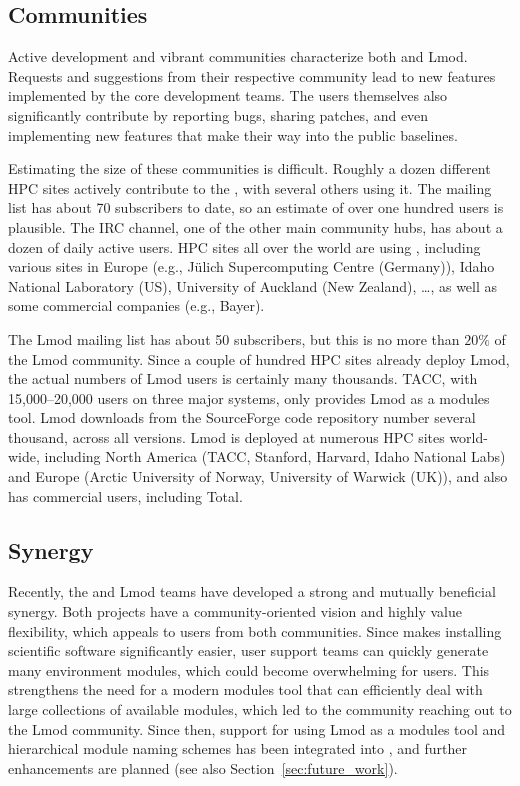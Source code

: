 \subsection{Communities}
\label{sec:communities}

Active development and vibrant communities characterize both \easybuild{} and Lmod.
Requests and suggestions from their respective community lead to new features
implemented by the core development teams. The users themselves also significantly
contribute by reporting bugs, sharing patches, and even implementing new features that
make their way into the public baselines.

Estimating the size of these communities is difficult. Roughly a dozen different HPC
sites actively contribute to the \easybuild{}, with several others using it.
The \easybuild{} mailing list has about 70 subscribers to date, so an
estimate of over one hundred users is plausible. The \easybuild{} IRC channel, one of
the other main community hubs, has about a dozen of daily active users. HPC sites all
over the world are using \easybuild{}, including various sites in Europe
(e.g., J\"ulich Supercomputing Centre (Germany)), Idaho National Laboratory (US),
University of Auckland (New Zealand), \ldots, as well as some commercial companies
(e.g., Bayer).

The Lmod mailing list has about 50 subscribers, but this is no more than $20\%$ of the
Lmod community. Since a couple of hundred HPC sites already deploy Lmod, the actual
numbers of Lmod users is certainly many thousands. TACC, with 15,000--20,000
users on three major systems, only provides Lmod as a modules tool. Lmod downloads
from the SourceForge code repository number several thousand, across all versions.
Lmod is deployed at numerous HPC sites world-wide, including North America (TACC,
Stanford, Harvard, Idaho National Labs) and Europe (Arctic University of Norway,
University of Warwick (UK)), and also has commercial users, including Total.

\subsection{Synergy}

Recently, the \easybuild{} and Lmod teams have developed
a strong and mutually beneficial synergy. Both projects have a
community-oriented vision and highly value flexibility, which appeals to users
from both communities. Since \easybuild{} makes installing scientific software
significantly easier, user support teams can quickly generate many environment
modules, which could become overwhelming for users. This strengthens the need for a
modern modules tool that can efficiently deal with large collections of available
modules, which led to the \easybuild{} community reaching out to the Lmod community.
Since then, support for using Lmod as a modules tool and  hierarchical
module naming schemes has been integrated into \easybuild{}, and further
enhancements are planned (see also Section~\ref{sec:future_work}).

